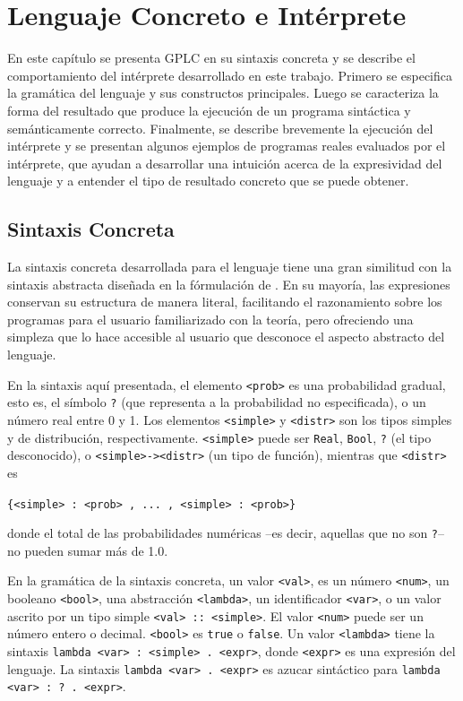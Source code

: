 
\newpage
\section{Lenguaje Concreto e Intérprete}



En este capítulo se presenta GPLC en su sintaxis concreta y se
describe el comportamiento del intérprete desarrollado en este
trabajo. Primero se especifica la gramática del lenguaje y sus
constructos principales. Luego se caracteriza la forma del resultado
que produce la ejecución de un programa sintáctica y semánticamente
correcto. Finalmente, se describe brevemente la ejecución del
intérprete y se presentan algunos ejemplos de programas reales
evaluados por el intérprete, que ayudan a desarrollar una intuición acerca de la
expresividad del lenguaje y a entender el tipo de resultado concreto que
se puede obtener.

\subsection{Sintaxis Concreta}\label{sec:concreto-sintaxis}
La sintaxis concreta desarrollada para el lenguaje tiene una gran similitud con la sintaxis abstracta diseñada en la fórmulación de \cite{gplc}. En su mayoría, las expresiones conservan su estructura de manera literal, facilitando el razonamiento sobre los programas para el usuario familiarizado con la teoría, pero ofreciendo una simpleza que lo hace accesible al usuario que desconoce el aspecto abstracto del lenguaje.

En la sintaxis aquí presentada, el elemento \lstinline|<prob>| es una probabilidad gradual, esto es, el símbolo \lstinline|?| (que representa a la probabilidad no especificada), o un número real entre 0 y 1. Los elementos \lstinline|<simple>| y \lstinline|<distr>| son los tipos simples y de distribución, respectivamente. \lstinline|<simple>| puede ser \lstinline|Real|, \lstinline|Bool|, \lstinline|?| (el tipo desconocido), o \lstinline|<simple>|\texttt{->}\lstinline|<distr>| (un tipo de función), mientras que \lstinline|<distr>| es
\begin{center}
  \lstinline|{<simple> : <prob> , ... , <simple> : <prob>}|
\end{center}
donde el total de las probabilidades numéricas --es decir, aquellas que no son \lstinline|?|-- no pueden sumar más de 1.0.

En la gramática de la sintaxis concreta, un valor \verb|<val>|, es un número \verb|<num>|, un booleano \verb|<bool>|, una abstracción \verb|<lambda>|, un identificador \lstinline|<var>|, o un valor ascrito por un tipo simple \lstinline|<val> :: <simple>|. El valor \lstinline|<num>| puede ser un número entero o decimal. \lstinline|<bool>| es \lstinline|true| o \lstinline|false|. Un valor \verb|<lambda>| tiene la sintaxis \lstinline|lambda <var> : <simple> . <expr>|, donde \lstinline|<expr>| es una expresión del lenguaje. La sintaxis \lstinline|lambda <var> . <expr>| es azucar sintáctico para \lstinline|lambda <var> : ? . <expr>|.


